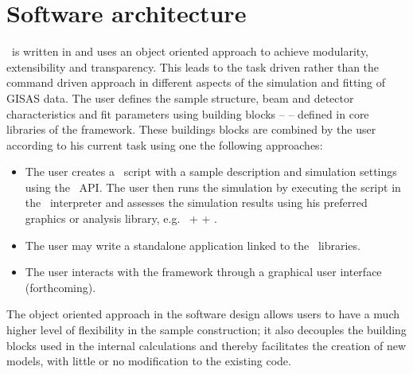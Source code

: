 

\newpage
\chapter{Software architecture}
 

\BornAgain\ is written in 
and uses an object oriented approach to 
achieve modularity, extensibility and transparency.
This leads to the task driven rather than the command driven approach in 
different aspects of the simulation and fitting of GISAS data.
The user defines the sample structure, beam and detector characteristics and
fit parameters using building
blocks --  -- defined in core libraries of the framework.
These buildings blocks are combined by the user according to his current
task using one the following approaches:
\begin{itemize}
\item The user creates a \Python\ script with a sample description and simulation settings
using the \BornAgain\ API.
The user then runs the simulation by executing the script in the \Python\ interpreter and assesses the
simulation results using his preferred graphics or analysis library, e.g. \Python\ +  + .
\item The user may write a standalone  application linked to the \BornAgain\ libraries.
\item The user interacts with the framework through a graphical 
user interface (forthcoming).
\end{itemize}

The object oriented approach in the software design allows users 
to have a much higher level of flexibility in the sample construction; it also
decouples the building blocks used in the internal calculations and thereby facilitates the creation of new models,
with little or no modification to the existing code. 


